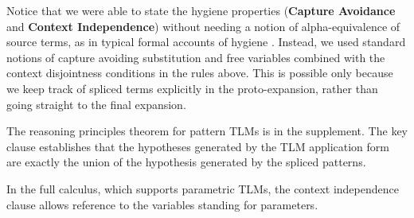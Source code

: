 \documentclass[acmsmall,review,anonymous]{acmart}\settopmatter{printfolios=true,printccs=false,printacmref=false}
\begin{document}

Notice that we were able to state the hygiene properties (\textbf{Capture Avoidance} and \textbf{Context Independence}) without needing a notion of alpha-equivalence of source terms, as in typical formal accounts of hygiene \cite{Kohlbecker86a,DBLP:conf/popl/Adams15,DBLP:conf/popl/ClingerR91,DBLP:journals/lisp/DybvigHB92,DBLP:conf/esop/HermanW08,Herman10:Theory}. Instead, we used standard notions of capture avoiding substitution and free variables combined with the context disjointness conditions in the rules above. This is possible only because we keep track of spliced terms explicitly in the proto-expansion, rather than going straight to the final expansion. %

The reasoning principles theorem for pattern TLMs is in the supplement. The key clause establishes that the hypotheses generated by the TLM application form are exactly the union of the hypothesis generated by the spliced patterns. %

In the full calculus, which supports parametric TLMs, the context independence clause allows reference to the variables standing for parameters.
\end{document}
